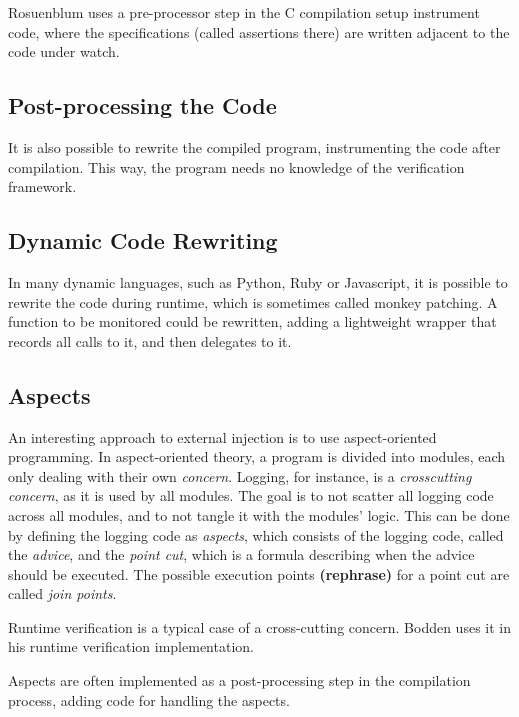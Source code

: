 \documentclass[a4paper,11pt]{kth-mag}
\newcommand{\rephrase}{\textbf{(rephrase)} }
\begin{document}
Rosuenblum \cite{rosenblum95practicalassertions} uses a pre-processor step in
the C compilation setup instrument code, where the specifications (called
assertions there) are written adjacent to the code under watch.


\subsection{Post-processing the Code}

It is also possible to rewrite the compiled program, instrumenting the code
after compilation. This way, the program needs no knowledge of the verification
framework.


\subsection{Dynamic Code Rewriting}

In many dynamic languages, such as Python, Ruby or Javascript, it is possible
to rewrite the code during runtime, which is sometimes called monkey patching.
A function to be monitored could be rewritten, adding a lightweight wrapper
that records all calls to it, and then delegates to it.


\subsection{Aspects}

An interesting approach to external injection is to use aspect-oriented
programming. In aspect-oriented theory, a program is divided into modules, each
only dealing with their own \textit{concern}. Logging, for instance, is a
\textit{crosscutting concern}, as it is used by all modules. The goal is to not
scatter all logging code across all modules, and to not tangle it with the
modules' logic. This can be done by defining the logging code as
\textit{aspects}, which consists of the logging code, called the
\textit{advice}, and the \textit{point cut}, which is a formula describing when
the advice should be executed. The possible execution points \rephrase for a
point cut are called \textit{join points}.

Runtime verification is a typical case of a cross-cutting concern. Bodden
\cite{bodden05efficientrv} uses it in his runtime verification implementation.

Aspects are often implemented as a post-processing step in the compilation
process, adding code for handling the aspects.
\end{document}
